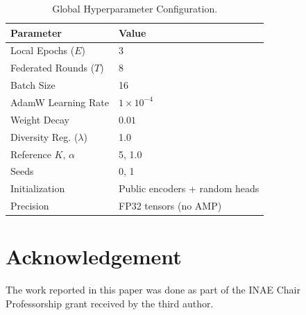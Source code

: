 \documentclass[letterpaper, conference]{IEEEtran}
\begin{document}
\begin{table}[t]
\caption{Global Hyperparameter Configuration.}
\label{tab:hyper}
\centering\footnotesize
\begin{tabular}{ll}
\toprule
\textbf{Parameter} & \textbf{Value} \\
\midrule
Local Epochs ($E$) & 3 \\
Federated Rounds ($T$) & 8 \\
Batch Size & 16 \\
AdamW Learning Rate & $1 \times 10^{-4}$ \\
Weight Decay & $0.01$ \\
Diversity Reg. ($\lambda$) & 1.0 \\
Reference $K$, $\alpha$ & 5, 1.0 \\
Seeds & 0, 1 \\
Initialization & Public encoders + random heads \\
Precision & FP32 tensors (no AMP) \\
\bottomrule
\end{tabular}
\end{table}




\FloatBarrier

\let\oldbibliography\thebibliography
\renewcommand{\thebibliography}[1]{%
  \oldbibliography{#1}%
  \scriptsize
  \setlength{\itemsep}{0pt}%
  \setlength{\parskip}{0pt}%
  \setlength{\topsep}{0pt}%
}

\section{Acknowledgement}
The work reported in this paper was done as part of the INAE Chair Professorship grant received by the third author.
\end{document}
